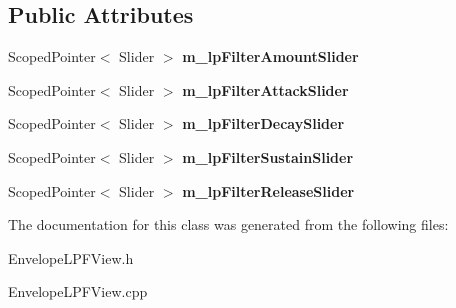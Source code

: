 \subsection*{Public Attributes}
\begin{DoxyCompactItemize}
\item 
Scoped\+Pointer$<$ Slider $>$ {\bfseries m\+\_\+lp\+Filter\+Amount\+Slider}\hypertarget{class_envelope_l_p_filter_view_a972bb0fe8aca6aaa2ad935a5cba1f68d}{}\label{class_envelope_l_p_filter_view_a972bb0fe8aca6aaa2ad935a5cba1f68d}

\item 
Scoped\+Pointer$<$ Slider $>$ {\bfseries m\+\_\+lp\+Filter\+Attack\+Slider}\hypertarget{class_envelope_l_p_filter_view_a4585886f5841ee52837c379555d842ac}{}\label{class_envelope_l_p_filter_view_a4585886f5841ee52837c379555d842ac}

\item 
Scoped\+Pointer$<$ Slider $>$ {\bfseries m\+\_\+lp\+Filter\+Decay\+Slider}\hypertarget{class_envelope_l_p_filter_view_a0a36ebd17417ccffdb989c02d138fbf2}{}\label{class_envelope_l_p_filter_view_a0a36ebd17417ccffdb989c02d138fbf2}

\item 
Scoped\+Pointer$<$ Slider $>$ {\bfseries m\+\_\+lp\+Filter\+Sustain\+Slider}\hypertarget{class_envelope_l_p_filter_view_aeb442218b00f4ad34ec082579bc0458a}{}\label{class_envelope_l_p_filter_view_aeb442218b00f4ad34ec082579bc0458a}

\item 
Scoped\+Pointer$<$ Slider $>$ {\bfseries m\+\_\+lp\+Filter\+Release\+Slider}\hypertarget{class_envelope_l_p_filter_view_ac619ebe7919d355a404bb49a8379aeeb}{}\label{class_envelope_l_p_filter_view_ac619ebe7919d355a404bb49a8379aeeb}

\end{DoxyCompactItemize}


The documentation for this class was generated from the following files\+:\begin{DoxyCompactItemize}
\item 
Envelope\+L\+P\+F\+View.\+h\item 
Envelope\+L\+P\+F\+View.\+cpp\end{DoxyCompactItemize}
